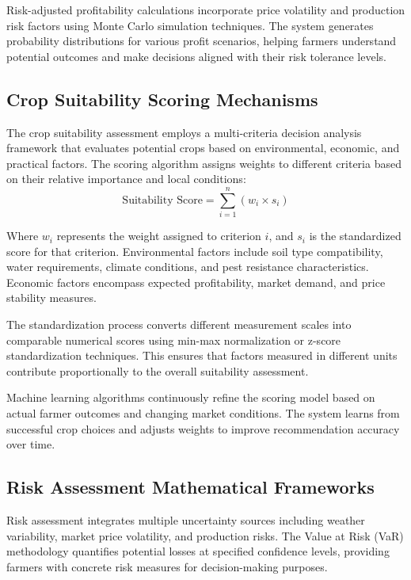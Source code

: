 Risk-adjusted profitability calculations incorporate price volatility and production risk factors using Monte Carlo simulation techniques. The system generates probability distributions for various profit scenarios, helping farmers understand potential outcomes and make decisions aligned with their risk tolerance levels.

\subsection{Crop Suitability Scoring Mechanisms}

The crop suitability assessment employs a multi-criteria decision analysis framework that evaluates potential crops based on environmental, economic, and practical factors. The scoring algorithm assigns weights to different criteria based on their relative importance and local conditions:
\begin{equation}
\text{Suitability Score} = \sum_{i=1}^{n} (w_i \times s_i)
\end{equation}

Where $w_i$ represents the weight assigned to criterion $i$, and $s_i$ is the standardized score for that criterion. Environmental factors include soil type compatibility, water requirements, climate conditions, and pest resistance characteristics. Economic factors encompass expected profitability, market demand, and price stability measures.

The standardization process converts different measurement scales into comparable numerical scores using min-max normalization or z-score standardization techniques. This ensures that factors measured in different units contribute proportionally to the overall suitability assessment.

Machine learning algorithms continuously refine the scoring model based on actual farmer outcomes and changing market conditions. The system learns from successful crop choices and adjusts weights to improve recommendation accuracy over time.

\subsection{Risk Assessment Mathematical Frameworks}

Risk assessment integrates multiple uncertainty sources including weather variability, market price volatility, and production risks. The Value at Risk (VaR) methodology quantifies potential losses at specified confidence levels, providing farmers with concrete risk measures for decision-making purposes.

